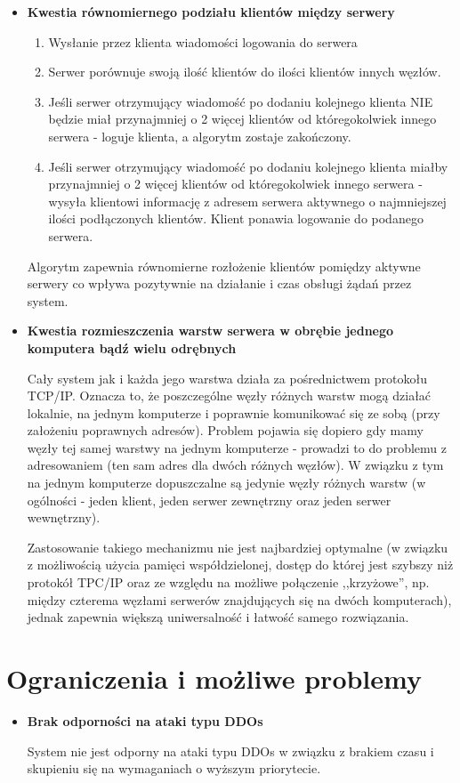 {\begin{itemize}
\item \textbf{Kwestia równomiernego podziału klientów między serwery}
\begin{enumerate}
\item Wysłanie przez klienta wiadomości logowania do serwera
\item Serwer porównuje swoją ilość klientów do ilości klientów innych węzłów.
\item Jeśli serwer otrzymujący wiadomość po dodaniu kolejnego klienta NIE będzie miał przynajmniej o 2 więcej klientów od któregokolwiek innego serwera - loguje klienta, a algorytm zostaje zakończony.
\item Jeśli serwer otrzymujący wiadomość po dodaniu kolejnego klienta miałby przynajmniej o 2 więcej klientów od któregokolwiek innego serwera - wysyła klientowi informację z adresem serwera aktywnego o najmniejszej ilości podłączonych klientów. Klient ponawia logowanie do podanego serwera.
\end{enumerate}
\par{Algorytm zapewnia równomierne rozłożenie klientów pomiędzy aktywne serwery co wpływa pozytywnie na działanie i czas obsługi żądań przez system.}

\item \textbf{Kwestia rozmieszczenia warstw serwera w obrębie jednego komputera bądź wielu odrębnych}
\par{Cały system jak i każda jego warstwa działa za pośrednictwem protokołu TCP/IP. Oznacza to, że poszczególne węzły różnych warstw mogą działać lokalnie, na jednym komputerze i poprawnie komunikować się ze sobą (przy założeniu poprawnych adresów). Problem pojawia się dopiero gdy mamy węzły tej samej warstwy na jednym komputerze - prowadzi to do problemu z adresowaniem (ten sam adres dla dwóch różnych węzłów). W związku z tym na jednym komputerze dopuszczalne są jedynie węzły różnych warstw (w ogólności - jeden klient, jeden serwer zewnętrzny oraz jeden serwer wewnętrzny).}

\par{Zastosowanie takiego mechanizmu nie jest najbardziej optymalne (w związku z możliwością użycia pamięci współdzielonej, dostęp do której jest szybszy niż protokół TPC/IP oraz ze względu na możliwe połączenie ,,krzyżowe'', np. między czterema węzłami serwerów znajdujących się na dwóch komputerach), jednak zapewnia większą uniwersalność i łatwość samego rozwiązania.}
\end{itemize}

\section[Ograniczenia i możliwe problemy]{Ograniczenia i możliwe problemy}
\begin{itemize}
\item \textbf{Brak odporności na ataki typu DDOs}
\par{System nie jest odporny na ataki typu DDOs w związku z brakiem czasu i skupieniu się na wymaganiach o wyższym priorytecie.}


\end{itemize}}

